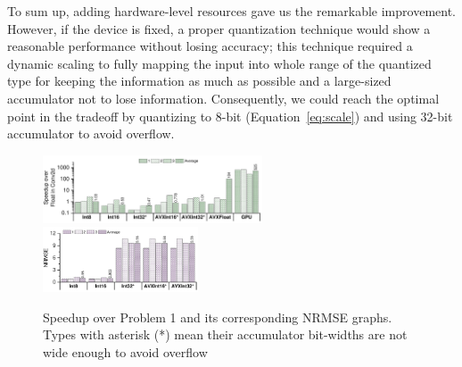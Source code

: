 \documentclass[a4paper,12pt]{article}
\begin{document}
\begin{enumerate}
\begin{answer}
				To sum up, adding hardware-level resources gave us the remarkable improvement.
				However, if the device is fixed, a proper quantization technique would show a reasonable performance without losing accuracy;  
				this technique required a dynamic scaling to fully mapping the input into whole range of the quantized type for keeping the information as much as possible and a large-sized accumulator not to lose information.
				Consequently, we could reach the optimal point in the tradeoff by quantizing to 8-bit (Equation~\ref{eq:scale}) and using 32-bit accumulator to avoid overflow.


				\begin{figure}[t]
					\centering
					\includegraphics[width=0.58\textwidth]{CS492_final_project_plot}
					\includegraphics[width=0.41\textwidth]{CS492_final_project_NRMSE}
					\caption{Speedup over Problem 1 and its corresponding NRMSE graphs. Types with asterisk (*) mean their accumulator bit-widths are not wide enough to avoid overflow}%
					\label{fig:plot}
				\end{figure}
				

				
				
			\end{answer}

	\end{enumerate}

	
	

	
\end{document}
